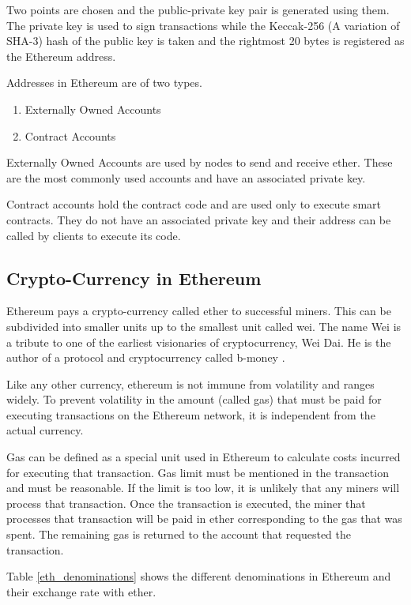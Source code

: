 \documentclass[11pt,openright]{report}
\begin{document}
Two points are chosen and the public-private key pair is generated using them. The private key is used to sign transactions while the Keccak-256 (A variation of SHA-3) hash of the public key is taken and the rightmost 20 bytes is registered as the Ethereum address.

Addresses in Ethereum are of two types.
\begin{enumerate}
    \item Externally Owned Accounts
    \item Contract Accounts
\end{enumerate}

Externally Owned Accounts are used by nodes to send and receive ether. These are the most commonly used accounts and have an associated private key.

Contract accounts hold the contract code and are used only to execute smart contracts. They do not have an associated private key and their address can be called by clients to execute its code.


\subsection{Crypto-Currency in Ethereum}
Ethereum pays a crypto-currency called ether to successful miners. This can be subdivided into smaller units up to the smallest unit called wei. The name Wei is a tribute to one of the earliest visionaries of cryptocurrency, Wei Dai. He is the author of a protocol and cryptocurrency called b-money \cite{dai1998bmoney}.

Like any other currency, ethereum is not immune from volatility and ranges widely. To prevent volatility in the amount (called gas) that must be paid for executing transactions on the Ethereum network, it is independent from the actual currency. 

Gas can be defined as a special unit used in Ethereum to calculate costs incurred for executing that transaction. Gas limit must be mentioned in the transaction and must be reasonable. If the limit is too low, it is unlikely that any miners will process that transaction. Once the transaction is executed, the miner that processes that transaction will be paid in ether corresponding to the gas that was spent. The remaining gas is returned to the account that requested the transaction.

Table \ref{eth_denominations} shows the different denominations in Ethereum and their exchange rate with ether.
\end{document}
